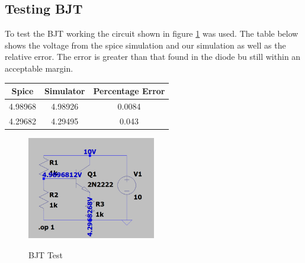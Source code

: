 \documentclass{article}
\begin{document}
\subsection{Testing BJT}
To test the BJT working the circuit shown in figure \ref{fig:BJTTest1} was used. The table below shows the voltage from the spice simulation and our simulation as well as the relative error. The error is greater than that found in the diode bu still within an acceptable margin. 
\begin{center}
\begin{tabular}{ ||c| c ||c ||}
\hline
 Spice & Simulator & Percentage Error \\ 
 \hline
 4.98968 & 4.98926 & 0.0084 \\  
 4.29682 & 4.29495 & 0.043 \\   
 \hline
\end{tabular}
\end{center}
\begin{figure}[h]
    \caption{BJT Test}
    \centering
    \includegraphics[width=0.5\textwidth]{images/BJTTest1.png}
    \label{fig:BJTTest1}
\end{figure}
\end{document}
